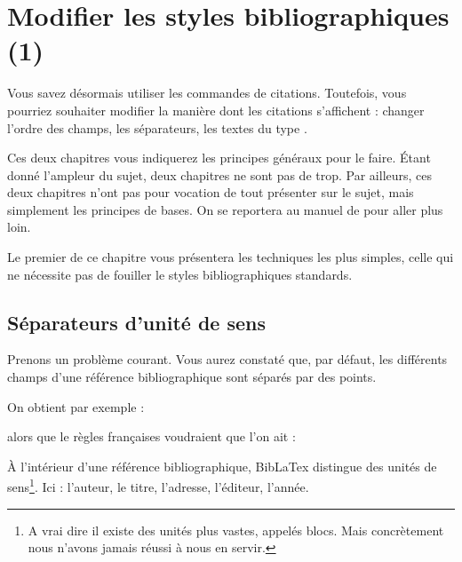 \chapter{Modifier les styles bibliographiques (1)}

	\begin{prealable}
	
	Vous savez désormais utiliser les commandes de citations. Toutefois, vous pourriez souhaiter modifier la manière dont les citations s'affichent :  changer l'ordre des champs, les séparateurs, les textes du type .
	
	Ces deux chapitres vous indiquerez les principes généraux pour le faire. Étant donné l'ampleur du sujet, deux chapitres ne sont pas de trop. Par ailleurs, ces deux chapitres n'ont pas pour vocation de tout présenter sur le sujet, mais simplement les principes de bases. On se reportera au manuel de  pour aller plus loin.
	
	Le premier de ce chapitre vous présentera les techniques les plus simples, celle qui ne nécessite pas de fouiller le styles bibliographiques standards. 
	
	
	\end{prealable}
	
	
\section{Séparateurs d'unité de sens}
	
Prenons un problème courant. Vous aurez constaté que, par défaut, les différents champs d'une référence bibliographique sont séparés par des points.

	On obtient par exemple :
	
	\renewcommand{\newunitpunct}[0]{\adddot\addspace} 
	
	\begin{quotation}
	\cite{Urner1952}
	\end{quotation}
	
alors que le règles françaises voudraient que l'on ait :
	
\renewcommand{\newunitpunct}[0]{\addcomma\addspace}
	
	\begin{quotation}
	\cite{Urner1952}
	\end{quotation}
	
À l'intérieur d'une référence bibliographique, BibLaTex distingue des unités de sens\footnote{A vrai dire il existe des unités plus vastes, appelés blocs. Mais concrètement nous n'avons jamais réussi à nous en servir.}. Ici : l'auteur, le titre, l'adresse, l'éditeur, l'année. 

